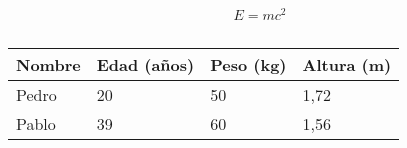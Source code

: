 \documentclass[notitlepage,oneside]{book}
\begin{document}












\begin{equation*}
E = mc^2    
\end{equation*}

\begin{table}[H]
\centering
\begin{tabular}{llll}
\toprule
Nombre & Edad (años) & Peso (kg) & Altura (m)\\
\midrule
Pedro & 20  & 50 &  1,72\\
Pablo & 39  & 60 &  1,56\\
\bottomrule
\end{tabular}
\caption{}
\label{tab:my-table}
\end{table}












\end{document}
